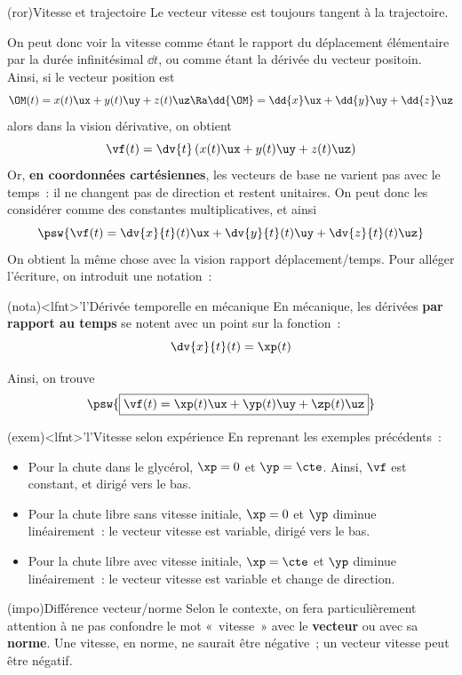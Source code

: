 \documentclass[../../main/main.tex]{subfiles}
\begin{document}
\begin{tcb*}(ror){Vitesse et trajectoire}
	Le vecteur vitesse est toujours tangent à la trajectoire.
\end{tcb*}

On peut donc voir la vitesse comme étant le rapport du déplacement élémentaire
par la durée infinitésimal $\dd{t}$, ou comme étant la dérivée du vecteur
positoin.
\smallbreak
Ainsi, si le vecteur position est
\[
	\OM(t) = x(t)\ux + y(t)\uy + z(t)\uz
	\Ra
	\dd{\OM} = \dd{x}\ux + \dd{y}\uy + \dd{z}\uz
\]
alors dans la vision dérivative, on obtient
\[\vf(t) = \dv{t}\left(x(t)\ux + y(t)\uy + z(t)\uz\right)\]
Or, \textbf{en coordonnées cartésiennes}, les vecteurs de base ne varient pas
avec le temps~: il ne changent pas de direction et restent unitaires. On peut
donc les considérer comme des constantes multiplicatives, et ainsi
\[\psw{\vf(t) = \dv{x}{t}(t)\ux + \dv{y}{t}(t)\uy + \dv{z}{t}(t)\uz}\]
On obtient la même chose avec la vision rapport déplacement/temps.
Pour alléger l'écriture, on introduit une notation~:
\begin{tcb*}(nota)<lfnt>'l'{Dérivée temporelle en mécanique}
	En mécanique, les dérivées \textbf{par rapport au temps} se notent avec un
	point sur la fonction~:
	\[\dv{x}{t}(t) = \xp(t)\]
\end{tcb*}
Ainsi, on trouve
\[\psw{\boxed{\vf(t) = \xp(t)\ux + \yp(t)\uy + \zp(t)\uz}}\]

\begin{tcb*}(exem)<lfnt>'l'{Vitesse selon expérience}
	En reprenant les exemples précédents~:
	\begin{itemize}
		\item Pour la chute dans le glycérol, $\xp = 0$ et $\yp = \cte$. Ainsi,
		      $\vf$ est constant, et dirigé vers le bas.
		\item Pour la chute libre sans vitesse initiale, $\xp = 0$ et $\yp$
		      diminue linéairement~: le vecteur vitesse est variable, dirigé vers
		      le bas.
		\item Pour la chute libre avec vitesse initiale, $\xp = \cte$ et $\yp$
		      diminue linéairement~: le vecteur vitesse est variable et change de
		      direction.
	\end{itemize}
\end{tcb*}

\begin{tcb*}(impo){Différence vecteur/norme}
	Selon le contexte, on fera particulièrement attention à ne pas confondre le
	mot «~vitesse~» avec le \textbf{vecteur} ou avec sa \textbf{norme}. Une
	vitesse, en norme, ne saurait être négative~; un vecteur vitesse peut être
	négatif.
\end{tcb*}
\end{document}
